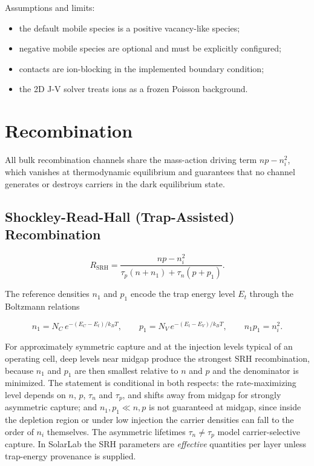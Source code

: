 \documentclass[
  11pt,
  american,
]{report}
\providecommand{\tightlist}{%
  \setlength{\itemsep}{0pt}\setlength{\parskip}{0pt}}
\begin{document}
Assumptions and limits:

\begin{itemize}
\tightlist
\item
  the default mobile species is a positive vacancy-like species;
\item
  negative mobile species are optional and must be explicitly
  configured;
\item
  contacts are ion-blocking in the implemented boundary condition;
\item
  the 2D J-V solver treats ions as a frozen Poisson background.
\end{itemize}

\hypertarget{recombination}{%
\section{Recombination}\label{recombination}}

All bulk recombination channels share the mass-action driving term
\(np - n_i^2\), which vanishes at thermodynamic equilibrium and
guarantees that no channel generates or destroys carriers in the dark
equilibrium state.

\hypertarget{shockley-read-hall-trap-assisted-recombination}{%
\subsection{Shockley-Read-Hall (Trap-Assisted)
Recombination}\label{shockley-read-hall-trap-assisted-recombination}}

\begin{equation}
\label{eq:srh}
R_\mathrm{SRH}
=
\frac{np-n_i^2}
{\tau_p(n+n_1)+\tau_n(p+p_1)} .
\end{equation}

The reference densities \(n_1\) and \(p_1\) encode the trap energy level
\(E_t\) through the Boltzmann relations

\[
n_1 = N_C\, e^{-(E_C-E_t)/k_BT},
\qquad
p_1 = N_V\, e^{-(E_t-E_V)/k_BT},
\qquad
n_1 p_1 = n_i^2 .
\]

For approximately symmetric capture and at the injection levels typical
of an operating cell, deep levels near midgap produce the strongest SRH
recombination, because \(n_1\) and \(p_1\) are then smallest relative to
\(n\) and \(p\) and the denominator is minimized. The statement is
conditional in both respects: the rate-maximizing level depends on
\(n\), \(p\), \(\tau_n\) and \(\tau_p\), and shifts away from midgap for
strongly asymmetric capture; and \(n_1, p_1 \ll n, p\) is not guaranteed
at midgap, since inside the depletion region or under low injection the
carrier densities can fall to the order of \(n_i\) themselves. The
asymmetric lifetimes \(\tau_n \neq \tau_p\) model carrier-selective
capture. In SolarLab the SRH parameters are \emph{effective} quantities
per layer unless trap-energy provenance is supplied.
\end{document}
